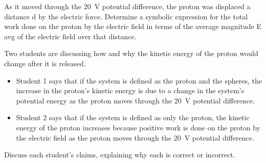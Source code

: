 \documentclass{../../../oss-ap12ibhl-print}
\begin{document}
\begin{questions}
\begin{parts}
\begin{subparts}
      \subpart As it moved through the \SI{20}{\volt} potential difference, the
      proton was displaced a distance d by the electric force. Determine a
      symbolic expression for the total work done on the proton by the electric
      field in terms of the average magnitude E avg of the electric field over
      that distance.

      \subpart Two students are discussing how and why the kinetic energy of
      the proton would change after it is released.
      \begin{itemize}
      \item Student 1 says that if the system is defined as the proton and the
        spheres, the increase in the proton’s kinetic energy is due to a change
        in the system's potential energy as the proton moves through the
        \SI{20}{\volt} potential difference.
      \item Student 2 says that if the system is defined as only the proton,
        the kinetic energy of the proton increases because positive work is
        done on the proton by the electric field as the proton moves through
        the \SI{20}{\volt} potential difference.
      \end{itemize}
      Discuss each student's claims, explaining why each is correct or
      incorrect.
    \end{subparts}
  \end{parts}
\end{questions}
\end{document}
